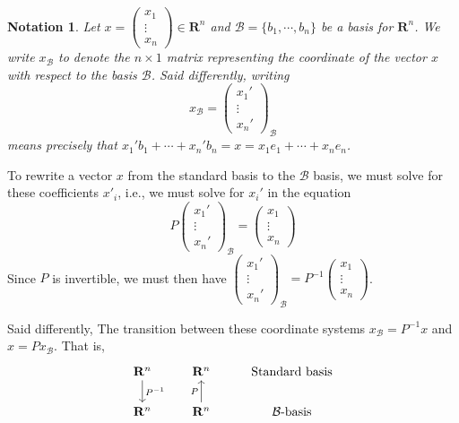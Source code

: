 \documentclass[12pt]{article}
\numberwithin{equation}{subsection}
\numberwithin{figure}{subsection}
\theoremstyle{note}
\newtheorem{notation}[subsection]{Notation}
\newcommand{\R}{\mathbf{R}}
\begin{document}
\begin{notation} 
Let $x= \begin{pmatrix} x_1 \\ \vdots\\x_n\end{pmatrix} \in \R^n$ and $\mathcal{B}=\{ b_1, \cdots, b_n\}$ be a basis for $\R^n$. We write $x_{\mathcal{B}}$ to denote the $n\times 1$ matrix representing the coordinate of the vector $x$ with respect to the basis $\mathcal{B}$. Said differently, writing \begin{equation} x_{\mathcal{B}}=\begin{pmatrix} x_1'  \\ \vdots \\ x_n'\end{pmatrix}_{\mathcal{B}}\end{equation} means precisely that $x_1' b_1 + \cdots +x_n'b_n=x=x_1e_1+\cdots+x_ne_n$. 
\end{notation}

To rewrite a vector $x$ from the standard basis to the $\mathcal{B}$ basis, we must solve for these coefficients $x'_i$, i.e., we must solve for $x_i'$ in the equation \[ P\begin{pmatrix} x_1' \\ \vdots \\ x_n'\end{pmatrix}_{\mathcal{B}} =\begin{pmatrix} x_1 \\ \vdots \\ x_n\end{pmatrix}\] 
Since $P$ is invertible, we must then have $\begin{pmatrix} x_1' \\ \vdots \\ x_n'\end{pmatrix}_{\mathcal{B}} =P^{-1}\begin{pmatrix} x_1 \\ \vdots \\ x_n\end{pmatrix}$. 

Said differently, The transition between these coordinate systems $x_{\mathcal{B}}=P^{-1}x$ and $x=Px_{\mathcal{B}}$. That is, 
\begin{equation} 
\begin{tikzcd} \R^n \arrow{d}{P^{-1}} & \R^n  & \text{Standard basis} \\ 
\R^n & \R^n \arrow{u}{P}  & \text{$\mathcal{B}$-basis} 
\end{tikzcd} 
\end{equation}
\end{document}
